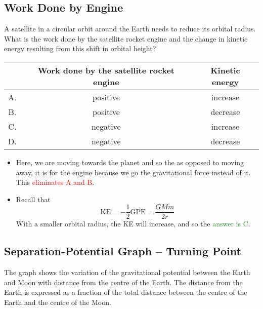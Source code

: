 \documentclass[a4paper,12pt]{article}
\begin{document}
\pagebreak

\subsection{Work Done by Engine}

A satellite in a circular orbit around the Earth needs to reduce its orbital radius.
What is the work done by the satellite rocket engine and the change in kinetic energy resulting from this shift in orbital height?

\begin{table}[H]
  \centering\begin{tabular}{|c|c|c|}
    \hline    & Work done by the satellite rocket engine & Kinetic energy \\
    \hline A. & positive                                 & increase       \\
    \hline B. & positive                                 & decrease       \\
    \hline C. & negative                                 & increase       \\
    \hline D. & negative                                 & decrease       \\
    \hline
  \end{tabular}
\end{table}

\begin{itemize}
  \item Here, we are moving towards the planet and so the as opposed to moving away, it is  for the engine because we go  the gravitational force instead of  it. This \textcolor{red}{eliminates A and B}.
  \item Recall that $$\text{KE} = -\frac{1}{2}\text{GPE} = \frac{GMm}{2r}$$
        With a smaller orbital radius, the KE will increase, and so the \textcolor{ForestGreen}{answer is C}.


\end{itemize}

\pagebreak

\subsection{Separation-Potential Graph -- Turning Point}

The graph shows the variation of the gravitational potential between the Earth and Moon with distance from the centre of the Earth. The distance from the Earth is expressed as a fraction of the total distance between the centre of the Earth and the centre of the Moon.
\end{document}
